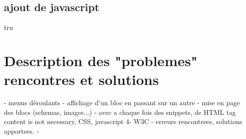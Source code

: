\documentclass{scrartcl}
\begin{document}
\subsection{ajout de javascript}
tru


\section{Description des "problemes" rencontres et solutions}
- menus déroulants
- affichage d’un bloc en passant sur un autre
- mise en page des blocs (schemas, images...)
- avec a chaque fois des snippets, de HTML tag content is not necessary, CSS, javascript 4- W3C
- erreurs rencontrees, solutions apportees. -
\end{document}
